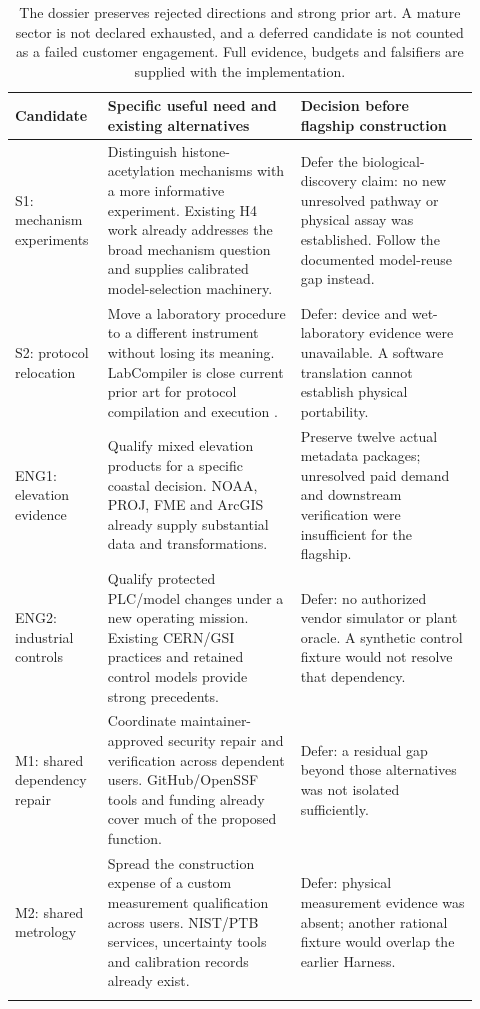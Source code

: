 \begingroup\small
\begin{longtable}{@{}p{0.17\linewidth}p{0.39\linewidth}p{0.36\linewidth}@{}}
\toprule Candidate & Specific useful need and existing alternatives & Decision before flagship construction \\ \midrule\endhead
S1: mechanism experiments & Distinguish histone-acetylation mechanisms with a more informative experiment. Existing H4 work already addresses the broad mechanism question and supplies calibrated model-selection machinery. & Defer the biological-discovery claim: no new unresolved pathway or physical assay was established. Follow the documented model-reuse gap instead. \\
S2: protocol relocation & Move a laboratory procedure to a different instrument without losing its meaning. LabCompiler is close current prior art for protocol compilation and execution \cite{labcompiler}. & Defer: device and wet-laboratory evidence were unavailable. A software translation cannot establish physical portability. \\
ENG1: elevation evidence & Qualify mixed elevation products for a specific coastal decision. NOAA, PROJ, FME and ArcGIS already supply substantial data and transformations. & Preserve twelve actual metadata packages; unresolved paid demand and downstream verification were insufficient for the flagship. \\
ENG2: industrial controls & Qualify protected PLC/model changes under a new operating mission. Existing CERN/GSI practices and retained control models provide strong precedents. & Defer: no authorized vendor simulator or plant oracle. A synthetic control fixture would not resolve that dependency. \\
M1: shared dependency repair & Coordinate maintainer-approved security repair and verification across dependent users. GitHub/OpenSSF tools and funding already cover much of the proposed function. & Defer: a residual gap beyond those alternatives was not isolated sufficiently. \\
M2: shared metrology & Spread the construction expense of a custom measurement qualification across users. NIST/PTB services, uncertainty tools and calibration records already exist. & Defer: physical measurement evidence was absent; another rational fixture would overlap the earlier Harness. \\ \bottomrule
\caption{The dossier preserves rejected directions and strong prior art. A mature sector is not declared exhausted, and a deferred candidate is not counted as a failed customer engagement. Full evidence, budgets and falsifiers are supplied with the implementation.}
\end{longtable}
\endgroup

